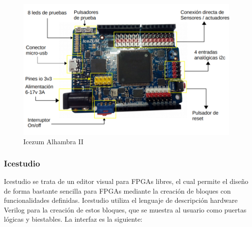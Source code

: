 \begin{figure}[H]
	\center
	\includegraphics[scale=0.6]{imagenes/Herramientas/Icezum2.png}
	\caption{Icezum Alhambra II}
	\label{fig:Icezum Alhambra II}
\end{figure}


\subsubsection{Icestudio}

Icestudio se trata de un editor visual para FPGAs libres, el cual permite el diseño de forma bastante sencilla para FPGAs mediante la creación de bloques con funcionalidades definidas. Icestudio utiliza el lenguaje de descripción hardware Verilog para la creación de estos bloques, que se muestra al usuario como puertas lógicas y biestables.  La interfaz es la siguiente:

